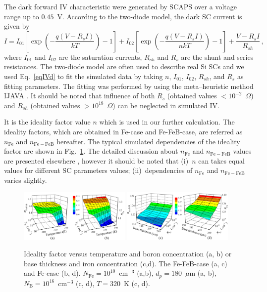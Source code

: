 \documentclass[a4paper,fleqn]{cas-sc}
\begin{document}
The dark forward IV characteristic were generated by SCAPS over a voltage range up to $0.45$~V.
According to the two-diode model, the dark SC current is given by \citep{Breitenstein2013}
\begin{equation}
\label{eqIVd}
    I=I_{01}\left[\exp\left(-\frac{q(V-R_sI)}{kT}\right)-1\right]
      + I_{02}\left[\exp\left(-\frac{q(V-R_sI)}{nkT}\right)-1\right]
      +\frac{V-R_sI}{R_{sh}}\,,
\end{equation}
where
$I_{01}$ and $I_{02}$ are the saturation currents,
$R_{sh}$ and $R_s$ are the shunt and series resistances.
The two-diode model are often used to describe real Si SCs
and we used Eq.~\ref{eqIVd} to fit the simulated data by taking $n$, $I_{01}$, $I_{02}$,
$R_{sh}$, and $R_s$ as fitting parameters.
The fitting was performed by using the meta--heuristic method IJAVA \cite{IJAVA}.
It should be noted that influence of both $R_s$ (obtained values $<10^{-2}$~$\Omega$) and $R_{sh}$
(obtained values $>10^{18}$~$\Omega$) can be neglected in simulated IV.

It is the ideality factor value $n$ which is used in our further calculation.
The ideality factors, which are obtained in  Fe-case and Fe-FeB-case,
are referred as  $n_\mathrm{Fe}$ and $n_\mathrm{Fe-FeB}$ hereafter.
The typical simulated dependencies of  the ideality factor are shown in Fig.~\ref{fig_nValues}.
The detailed discussion about $n_\mathrm{Fe}$ and $n_\mathrm{Fe-FeB}$  values are presented elsewhere \cite{OlikhJPS},
however it should be noted that
(i)~$n$ can takes equal values for different SC parameters values;
(ii)~dependencies of $n_\mathrm{Fe}$ and $n_\mathrm{Fe-FeB}$ varies slightly.

\begin{figure}[bt]
\centering
\includegraphics[width=0.48\textwidth]{Fig1a}
\includegraphics[width=0.48\textwidth]{Fig1b}
\caption{Ideality factor versus temperature and boron concentration (a, b)
or base thickness and iron concentration (c,d).
The Fe-FeB-case (a, c) and Fe-case (b, d).
$N_\mathrm{Fe}=10^{10}$~cm$^{-3}$ (a,b),
$d_p=180$~$\mu$m (a, b),
$N_\mathrm{B}=10^{16}$~cm$^{-3}$ (c, d),
$T=320$~K (c, d).
}
\label{fig_nValues}
\end{figure}
\end{document}
